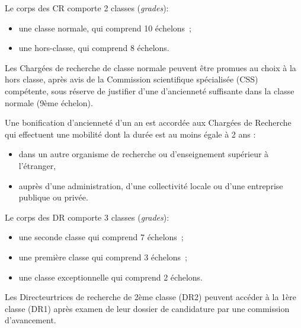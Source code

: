 Le corps des CR comporte 2 classes
(\textit{grades}):
\begin{itemize}
\item une classe normale, qui comprend 10 \'echelons~;
\item une hors-classe, qui comprend 8 \'echelons.
\end{itemize}
Les Charg\'e\mp e\mp s de recherche de classe normale peuvent \^etre promu\mp e\mp s au choix \`a la hors classe, apr\`es avis de la Commission scientifique sp\'ecialis\'ee (CSS) comp\'etente, sous r\'eserve de justifier d'une d'anciennet\'e suffisante dans la classe normale (9\`eme \'echelon).

Une bonification d'anciennet\'e d'un an est accord\'ee aux Charg\'e\mp e\mp s de Recherche qui effectuent une mobilit\'e dont la dur\'ee est au moins \'egale \`a 2 ans :
\begin{itemize}
\item dans un autre organisme de recherche ou d'enseignement sup\'erieur \`a l'\'etranger,
\item aupr\`es d'une administration, d'une collectivit\'e locale ou d'une entreprise publique ou priv\'ee.
\end{itemize}

Le corps des DR comporte 3
classes (\textit{grades}):
\begin{itemize}
\item une seconde classe qui comprend 7 \'echelons~;
\item une premi\`ere classe qui comprend 3 \'echelons~;
\item une classe exceptionnelle qui comprend 2 \'echelons.
\end{itemize}
Les Directeur\mp trices de recherche de 2\`eme classe (DR2) peuvent acc\'eder \`a la 1\`ere classe (DR1) apr\`es examen de leur dossier de candidature par une commission d'avancement.

